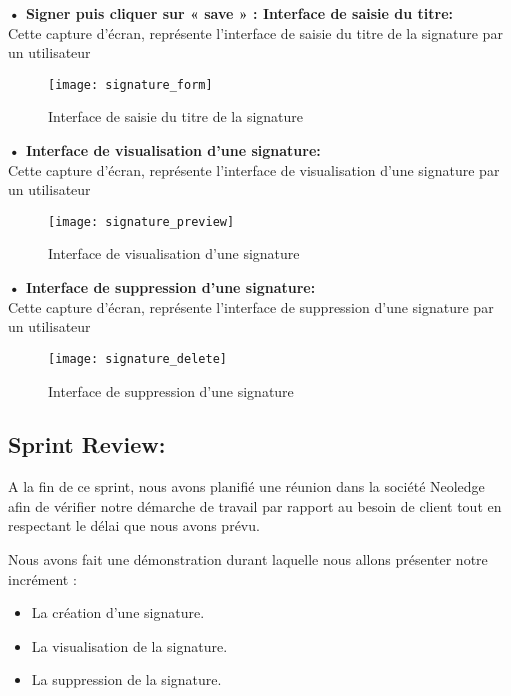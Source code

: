 \textbf{•	Signer puis cliquer sur « save » : Interface de saisie du titre:}\\
Cette capture d'écran, représente l'interface de saisie du titre de la signature par un utilisateur
\begin{figure}[H]
  \centering
  \texttt{[image: signature\_form]}
  \caption{Interface de saisie du titre de la signature}
  \label{fig:signature_title}
\end{figure}

\textbf{•	Interface de visualisation d'une signature:}\\
Cette capture d'écran, représente l'interface de visualisation d'une signature par un utilisateur

\begin{figure}[H]
  \centering
  \texttt{[image: signature\_preview]}
  \caption{Interface de visualisation d'une signature}
  \label{fig:signature_view}
\end{figure}

\textbf{•	Interface de suppression d'une signature:}\\
Cette capture d'écran, représente l'interface de suppression d'une signature par un utilisateur

\begin{figure}[h!]
  \centering
  \texttt{[image: signature\_delete]}
  \caption{Interface de suppression d'une signature}
  \label{fig:signature_delete}
\end{figure}



\subsection{Sprint Review:}
A la fin de ce sprint, nous avons planifié une réunion dans la société Neoledge afin de vérifier notre démarche de travail par rapport au besoin de client tout en respectant le délai que nous avons prévu.

Nous avons fait une démonstration durant laquelle nous allons présenter notre incrément :

\begin{itemize}
  \item La création d'une signature.
  \item La visualisation de la signature.
  \item La suppression de la signature.
\end{itemize}

